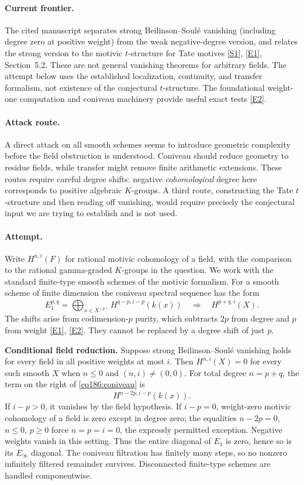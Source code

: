 \documentclass[11pt,a4paper]{article}
\newcommand{\sref}[2]{\hyperlink{source:#1:#2}{[S#2]}}
\newcommand{\eref}[2]{\hyperlink{extra:#1:#2}{[E#2]}}
\numberwithin{equation}{section}
\begin{document}
\paragraph{Current frontier.}
The cited manuscript separates strong Beilinson--Soul\'e vanishing (including degree zero at positive weight) from the weak negative-degree version, and relates the strong version to the motivic $t$-structure for Tate motives \sref{186}{1}, \eref{186}{1}, Section~5.2. These are not general vanishing theorems for arbitrary fields. The attempt below uses the established localization, continuity, and transfer formalism, not existence of the conjectural $t$-structure. The foundational weight-one computation and coniveau machinery provide useful exact tests \eref{186}{2}.

\paragraph{Attack route.}
A direct attack on all smooth schemes seems to introduce geometric complexity before the field obstruction is understood. Coniveau should reduce geometry to residue fields, while transfer might remove finite arithmetic extensions. These routes require careful degree shifts: negative \emph{cohomological} degree here corresponds to positive algebraic $K$-groups. A third route, constructing the Tate $t$-structure and then reading off vanishing, would require precisely the conjectural input we are trying to establish and is not used.

\paragraph{Attempt.}
Write $H^{n,i}(F)$ for rational motivic cohomology of a field, with the comparison to the rational gamma-graded $K$-groups in the question. We work with the standard finite-type smooth schemes of the motivic formalism. For a smooth scheme of finite dimension the coniveau spectral sequence has the form
\begin{equation}\label{eq186:coniveau}
 E_1^{p,q}=\bigoplus_{x\in X^{(p)}}H^{q-p,i-p}(k(x))
 \quad\Longrightarrow\quad H^{p+q,i}(X).
\end{equation}
The shifts arise from codimension-$p$ purity, which subtracts $2p$ from degree and $p$ from weight \eref{186}{1}, \eref{186}{2}. They cannot be replaced by a degree shift of just $p$.

\textbf{Conditional field reduction.} Suppose strong Beilinson--Soul\'e vanishing holds for every field in all positive weights at most $i$. Then $H^{n,i}(X)=0$ for every such smooth $X$ when $n\le0$ and $(n,i)\ne(0,0)$.
For total degree $n=p+q$, the term on the right of \eqref{eq186:coniveau} is
\[
 H^{n-2p,i-p}(k(x)).
\]
If $i-p>0$, it vanishes by the field hypothesis. If $i-p=0$, weight-zero motivic cohomology of a field is zero except in degree zero; the equalities $n-2p=0$, $n\le0$, $p\ge0$ force $n=p=i=0$, the expressly permitted exception. Negative weights vanish in this setting. Thus the entire diagonal of $E_1$ is zero, hence so is its $E_\infty$ diagonal. The coniveau filtration has finitely many steps, so no nonzero infinitely filtered remainder survives. Disconnected finite-type schemes are handled componentwise.
\end{document}
